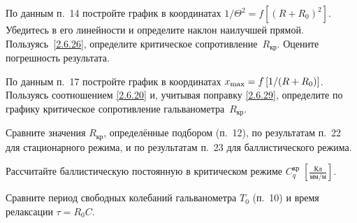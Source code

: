 \begin{lab:task}
    По данным п.~14 постройте график в координатах
    $1/\Theta^2=f[(R+R_0)^2]$. Убедитесь в его линейности и определите
    наклон наилучшей прямой. Пользуясь~\eqref{2.6.26},
    определите критическое сопротивление~$R_{кр}$. Оцените погрешность результата.

	\item По данным п.~17 постройте график в координатах 
    $x_{\rm max} = f \left [1/(R + R_0) \right]$. 
    Пользуясь соотношением \eqref{2.6.20} и, учитывая поправку
    \eqref{2.6.29}, определите по графику критическое сопротивление 
    гальванометра~$R_{кр}$.


	\item Сравните значения $R_{\text{кр}}$, определённые подбором (п.~12),
     по результатам п.~22 для стационарного режима, и по результатам 
     п.~23 для баллистического режима.

	\item Рассчитайте баллистическую постоянную в критическом режиме 
    $C_{q}^{\text{кр}}\;\left[\frac{Кл}{мм/м}\right]$.

	\item Сравните период свободных колебаний гальванометра $T_0$ (п.~10) 
    и время релаксации $\tau = R_0 C$.
\end{lab:task}


